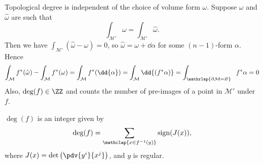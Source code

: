 \documentclass{jknotes}
\begin{document}
Topological degree is independent of the choice of volume form \(\omega\). Suppose \(\omega\) and \(\hat{\omega}\) are such that
\begin{equation}
    \int_{\mathcal{M}'}\omega = \int_{\mathcal{M}'}\hat{\omega}.
\end{equation}
Then we have \(\int_{\mathcal{M}'}(\hat{\omega}-\omega)=0\), so \(\hat{\omega} = \omega+\dd{\alpha}\) for some \((n-1)\)-form \(\alpha\). Hence
\begin{equation}
    \int_{\mathcal{M}} f^*(\hat{\omega}) - \int_{\mathcal{M}} f^*(\omega)
    = \int_{\mathcal{M}} f^*(\dd{\alpha}) = \int_{\mathcal{M}} \dd{(f^*\alpha)}
    = \int_{\mathrlap{\partial\mathcal{M}=\varnothing}}\;\;f^*\alpha = 0
\end{equation}
Also, \(\deg(f) \in \ZZ\) and counts the number of pre-images of a point in \(\mathcal{M}'\) under \(f\).

\begin{theorem}
    \(\deg(f)\) is an integer given by 
    \begin{equation}
        \deg(f) = \sum_{\mathclap{x \in f^{-1}(y)}} \operatorname{sign}(J(x)),
    \end{equation}
    where \(J(x) = \det \left(\pdv{y^i}{x^j}\right)\), and \(y\) is regular.
\end{theorem}
\end{document}
